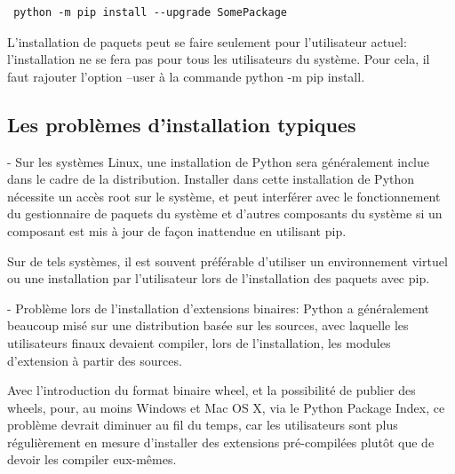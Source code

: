 \documentclass[a4paper,12pt]{article}
\begin{document}
\begin{verbatim}
 python -m pip install --upgrade SomePackage
\end{verbatim}
L'installation de paquets peut se faire seulement pour l'utilisateur actuel: l'installation ne se fera pas pour tous les utilisateurs du système. Pour cela, il faut rajouter l'option --user à la commande python -m pip install.

\subsection{Les problèmes d'installation typiques}
- Sur les systèmes Linux, une installation de Python sera généralement inclue dans le cadre de la distribution. Installer dans cette installation de Python nécessite un accès root sur le système, et peut interférer avec le fonctionnement du gestionnaire de paquets du système et d’autres composants du système si un composant est mis à jour de façon inattendue en utilisant pip.

Sur de tels systèmes, il est souvent préférable d’utiliser un environnement virtuel ou une installation par l’utilisateur lors de l’installation des paquets avec pip.

- Problème lors de l'installation d'extensions binaires:
Python a généralement beaucoup misé sur une distribution basée sur les sources, avec laquelle les utilisateurs finaux devaient compiler, lors de l’installation, les modules d’extension à partir des sources.

Avec l’introduction du format binaire wheel, et la possibilité de publier des wheels, pour, au moins Windows et Mac OS X, via le Python Package Index, ce problème devrait diminuer au fil du temps, car les utilisateurs sont plus régulièrement en mesure d’installer des extensions pré-compilées plutôt que de devoir les compiler eux-mêmes.
\end{document}
